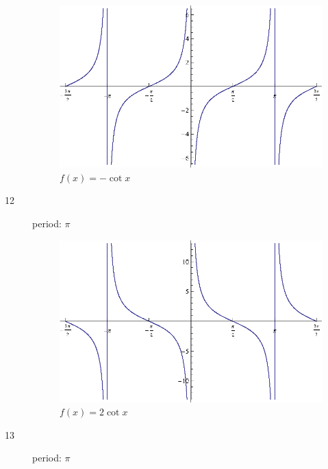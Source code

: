\documentclass{exam}
\begin{document}
\begin{description}
        \begin{figure}[H]
          \centering
          \includegraphics[scale=0.8]{exercise11.eps}
          \caption{$f(x) = - \cot x$}
        \end{figure}

      \item[12]
        period: $\pi$

        \begin{figure}[H]
          \centering
          \includegraphics[scale=0.8]{exercise12.eps}
          \caption{$f(x) = 2 \cot x$}
        \end{figure}

      \item[13]
        period: $\pi$


\end{description}
\end{document}

